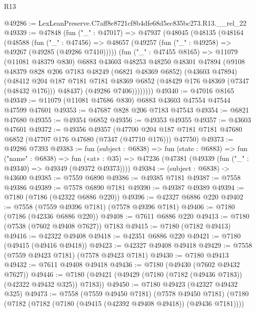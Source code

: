 \begin{lexlean}{R13}
\begin{coremodule}
@49286 := LexLeanPreserve.C7aff8e8721cf8b4dfe68d5ec835bc273.R13.__rel_22
@49339 := @47848
    (fun ("_" : @47017) =>
    @47937
      (@48045
        (@48135
          (@48164
            (@48588
              (fun ("_" : @47456) =>
              @48657 (@49257 (fun ("_" : @49258) => @49267 (@49285 (@49286 @7410)))))
              (fun ("_" : @47455 @8165) =>
              @11079
                (@11081 @48379 @830)
                @6883
                @43603
                @48253
                @48250
                @48301
                @47894
                (@9108
                  @48379
                  @828
                  @206
                  @7183
                  @48249
                  (@6821 @48369 @6852)
                  (@43603 @47894)
                  (@48412
                    @204
                    @187
                    @7181
                    @7181
                    @48369
                    @6852
                    (@48429 @176 @48369 (@7347 (@48432 @176)))
                    @48437)
                  (@49286 @7406))))))))
@49340 := @47016 @8165
@49349 := @11079 (@11081 @47686 @830) @6883 @43603 @47554 @47544 @47599 @47601
@49353 := @47687 @828 @206 @7183 @47543
@49354 := @6821 @47680
@49355 := @49354 @6852
@49356 := @49353 @49355
@49357 := @43603 @47601
@49372 := @49356
    @49357
    (@47700 @204 @187 @7181 @7181 @47680 @6852 (@47707 @176 @47680 (@7347 (@47710 @176))) @47750)
@49373 := @49286 @7393
@49383 := fun (subject : @6838) =>
  fun (state : @6883) =>
  fun ("name" : @6838) =>
  fun («at» : @35) => @47236 (@47381 (@49339 (fun ("_" : @49340) => @49349 (@49372 @49373))))
@49384 := (subject : @6838) -> @43600
@49385 := @7559 @6890
@49386 := @49385 @7181
@49387 := @7558 @49386
@49389 := @7578 @6890 @7181
@49390 := @49387 @49389
@49394 := @7180 (@7186 (@42322 @6886 @220))
@49396 := @42327 @6886 @220
@49402 := @7558 (@7559 @49396 @7181) (@7578 @49396 @7181)
@49406 := @7180 (@7186 (@42336 @6886 @220))
@49408 := @7611 @6886 @220
@49413 := @7180 (@7538 (@7602 @49408 @7627)) @7183
@49415 := @7180 (@7182 @49413)
@49416 := @42322 @49408
@49418 := @42351 @6886 @220
@49421 := @7180 (@49415 (@49416 @49418))
@49423 := @42327 @49408 @49418
@49429 := @7558 (@7559 @49423 @7181) (@7578 @49423 @7181)
@49430 := @7180 @49413
@49432 := @7611 @49408 @49418
@49436 := @7180 (@49430 (@7602 @49432 @7627))
@49446 := @7180 (@49421 (@49429 (@7180 (@7182 (@49436 @7183)) (@42322 @49432 @325)) @7183))
@49450 := @7180 @49423 (@42327 @49432 @325)
@49473 := @7558
    (@7559 @49450 @7181)
    (@7578 @49450 @7181)
    (@7180
      (@7182 (@7182 (@7180 (@49415 (@42392 @49408 @49418)) (@49436 @7181))))

\end{coremodule}
\end{lexlean}
